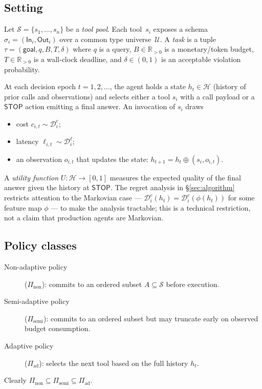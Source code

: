 \subsection{Setting}
Let $\mathcal{S} = \{s_1, \dots, s_n\}$ be a \emph{tool pool}. Each
tool~$s_i$ exposes a schema
$\sigma_i = (\mathsf{In}_i, \mathsf{Out}_i)$ over a common type
universe~$\mathcal{U}$. A \emph{task} is a tuple
$\tau = (\mathsf{goal}, q, B, T, \delta)$ where $q$ is a query,
$B \in \mathbb{R}_{>0}$ is a monetary/token budget,
$T \in \mathbb{R}_{>0}$ is a wall-clock deadline, and
$\delta \in (0,1)$ is an acceptable violation probability.

At each decision epoch $t = 1, 2, \dots$, the agent holds a state
$h_t \in \mathcal{H}$ (history of prior calls and observations) and
selects either a tool $s_i$ with a call payload or a $\mathsf{STOP}$
action emitting a final answer. An invocation of $s_i$ draws
\begin{itemize}
  \item cost $c_{i,t} \sim \mathcal{D}_i^c$;
  \item latency $\ell_{i,t} \sim \mathcal{D}_i^\ell$;
  \item an observation $o_{i,t}$ that updates the state:
    $h_{t+1} = h_t \oplus (s_i, o_{i,t})$.
\end{itemize}
A \emph{utility function} $U: \mathcal{H} \to [0,1]$ measures the
expected quality of the final answer given the history at
$\mathsf{STOP}$. The regret analysis in \S\ref{sec:algorithm}
restricts attention to the Markovian case
--- $\mathcal{D}_i^c(h_t) = \mathcal{D}_i^c(\phi(h_t))$ for some
feature map $\phi$ --- to make the analysis tractable; this is a
technical restriction, not a claim that production agents are
Markovian.

\subsection{Policy classes}
\begin{description}
  \item[Non-adaptive policy]
    ($\Pi_{\mathrm{non}}$): commits to an ordered subset
    $A \subseteq \mathcal{S}$ before execution.
  \item[Semi-adaptive policy]
    ($\Pi_{\mathrm{semi}}$): commits to an ordered subset but may
    truncate early on observed budget consumption.
  \item[Adaptive policy]
    ($\Pi_{\mathrm{ad}}$): selects the next tool based on the full
    history $h_t$.
\end{description}
Clearly
$\Pi_{\mathrm{non}} \subseteq \Pi_{\mathrm{semi}} \subseteq \Pi_{\mathrm{ad}}$.

